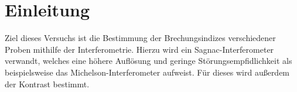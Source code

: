 \section{Einleitung}
Ziel dieses Versuchs ist die Bestimmung der Brechungsindizes verschiedener Proben mithilfe der Interferometrie. Hierzu wird ein Sagnac-Interferometer verwandt, welches eine höhere Auflösung und
geringe Störungsempfidlichkeit als beispielsweise das Michelson-Interferometer aufweist. Für dieses wird außerdem der Kontrast bestimmt. 
